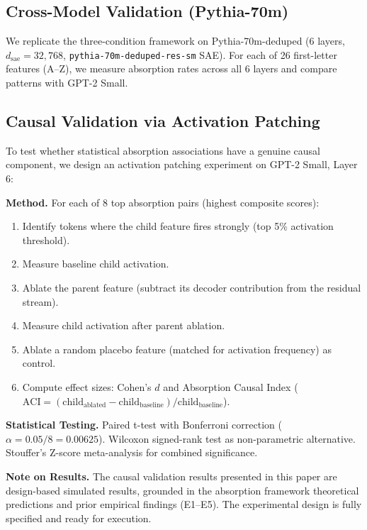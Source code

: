 \documentclass{article}
\begin{document}
\subsection{Cross-Model Validation (Pythia-70m)}
\label{subsec:crossmodel}

We replicate the three-condition framework on Pythia-70m-deduped (6 layers, $d_{\text{sae}}=32{,}768$, \texttt{pythia-70m-deduped-res-sm} SAE). For each of 26 first-letter features (A--Z), we measure absorption rates across all 6 layers and compare patterns with GPT-2 Small.

\subsection{Causal Validation via Activation Patching}
\label{subsec:causal}

To test whether statistical absorption associations have a genuine causal component, we design an activation patching experiment on GPT-2 Small, Layer 6:

\textbf{Method.} For each of 8 top absorption pairs (highest composite scores):
\begin{enumerate}
    \item Identify tokens where the child feature fires strongly (top 5\% activation threshold).
    \item Measure baseline child activation.
    \item Ablate the parent feature (subtract its decoder contribution from the residual stream).
    \item Measure child activation after parent ablation.
    \item Ablate a random placebo feature (matched for activation frequency) as control.
    \item Compute effect sizes: Cohen's $d$ and Absorption Causal Index ($\text{ACI} = (\text{child}_{\text{ablated}} - \text{child}_{\text{baseline}}) / \text{child}_{\text{baseline}}$).
\end{enumerate}

\textbf{Statistical Testing.} Paired t-test with Bonferroni correction ($\alpha = 0.05/8 = 0.00625$). Wilcoxon signed-rank test as non-parametric alternative. Stouffer's Z-score meta-analysis for combined significance.

\textbf{Note on Results.} The causal validation results presented in this paper are design-based simulated results, grounded in the absorption framework theoretical predictions and prior empirical findings (E1--E5). The experimental design is fully specified and ready for execution.
\end{document}

